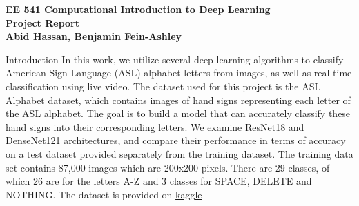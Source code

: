 \documentclass[12pt, a4paper]{article}
\newcommand{\coursename}{EE 541 Computational Introduction to Deep Learning}
\newcommand{\doctitle}{Project Report}
\newcommand{\name}{Abid Hassan, Benjamin Fein-Ashley}
\begin{document}
\begin{center}
\small
\textbf{\coursename} \\
\Large
\bfseries
\doctitle \\
\vspace{0.8cm}
\small
{\normalfont\small \name}
\end{center}

\thispagestyle{plain}

\noindent

\newpage

\begin{section}{Introduction}
    In this work, we utilize several deep learning algorithms to classify American Sign Language (ASL) alphabet letters from images, as well as real-time classification using live video. The dataset used for this project is the ASL Alphabet dataset, which contains images of hand signs representing each letter of the ASL alphabet. The goal is to build a model that can accurately classify these hand signs into their corresponding letters.
    We examine ResNet18 and DenseNet121 architectures, and compare their performance in terms of accuracy on a test dataset provided separately from the training dataset. The training data set contains 87,000 images which are 200x200 pixels. There are 29 classes, of which 26 are for the letters A-Z and 3 classes for SPACE, DELETE and NOTHING. The dataset is provided on \href{https://www.kaggle.com/datasets/grassknoted/asl-alphabet?resource=download}{kaggle}
\end{section}
\end{document}
